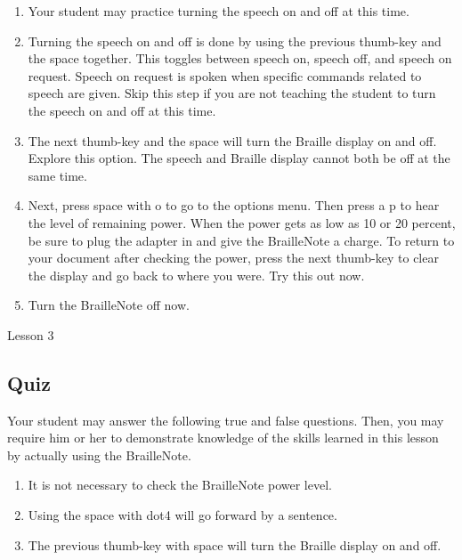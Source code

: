 \documentclass[10pt,letterpaper,twoside]{report}
\begin{document}
{{{{\begin{enumerate}
	\item Your student may practice turning the speech on and off at this time.
	      
	\item Turning the speech on and off is done by using the previous thumb-key and the space together.  This toggles between speech on, speech off, and speech on request.  Speech on request is spoken when specific commands related to speech are given. Skip this step if you are not teaching the student to turn the speech on and off at this time.
	      
	\item The next thumb-key and the space will turn the Braille display on and off.  Explore this option.  The speech and Braille display cannot both be off at the same time.
	      
	\item Next, press space with o to go to the options menu.  Then press a p to hear the level of remaining power.  When the power gets as low as 10 or 20 percent, be sure to plug the adapter in and give the BrailleNote a charge.  To return to your document after checking the power, press the next thumb-key to clear the display and go back to where you were.  Try this out now.
	      
	\item Turn the BrailleNote off now.
\end{enumerate}





\clearpage

\newpage
Lesson 3

\subsection{Quiz}



Your student may answer the following true and false questions.  Then, you may require him or her to demonstrate knowledge of the skills learned in this lesson by actually using the BrailleNote.



\begin{enumerate}
	\item It is not necessary to check the BrailleNote power level.
	      
	\item Using the space with dot4 will go forward by a sentence.
	      
	\item The previous thumb-key with space will turn the Braille display on and off.
	      

\end{enumerate}}}}}
\end{document}
